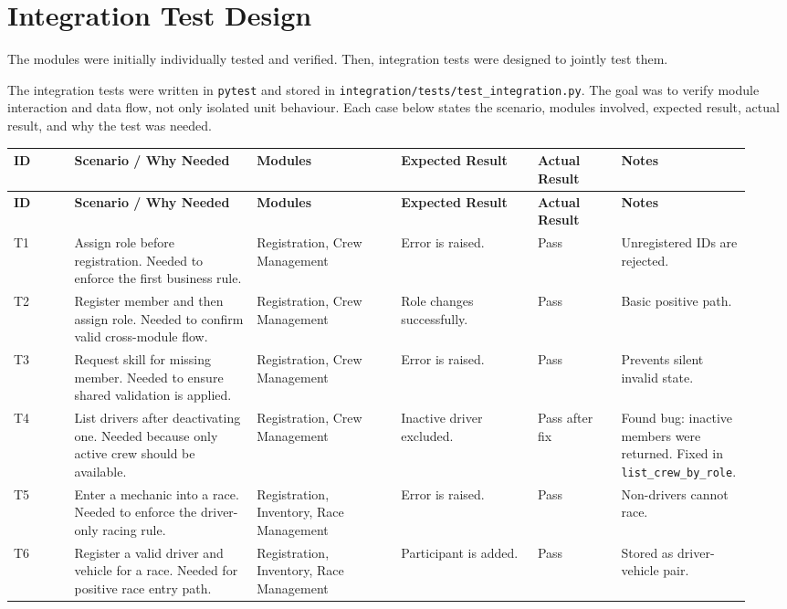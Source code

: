 \documentclass[12pt]{article}
\begin{document}
\section{Integration Test Design}
The modules were initially individually tested and verified. Then, integration tests were designed to jointly test them.

The integration tests were written in \texttt{pytest} and stored in \texttt{integration/tests/test\_integration.py}. The goal was to verify module interaction and data flow, not only isolated unit behaviour. Each case below states the scenario, modules involved, expected result, actual result, and why the test was needed.

\renewcommand{\arraystretch}{1.2}
\small
\begin{longtable}{p{0.08\linewidth}p{0.24\linewidth}p{0.19\linewidth}p{0.18\linewidth}p{0.11\linewidth}p{0.14\linewidth}}
\toprule
\textbf{ID} & \textbf{Scenario / Why Needed} & \textbf{Modules} & \textbf{Expected Result} & \textbf{Actual Result} & \textbf{Notes} \\
\midrule
\endfirsthead
\toprule
\textbf{ID} & \textbf{Scenario / Why Needed} & \textbf{Modules} & \textbf{Expected Result} & \textbf{Actual Result} & \textbf{Notes} \\
\midrule
\endhead
T1 & Assign role before registration. Needed to enforce the first business rule. & Registration, Crew Management & Error is raised. & Pass & Unregistered IDs are rejected. \\
T2 & Register member and then assign role. Needed to confirm valid cross-module flow. & Registration, Crew Management & Role changes successfully. & Pass & Basic positive path. \\
T3 & Request skill for missing member. Needed to ensure shared validation is applied. & Registration, Crew Management & Error is raised. & Pass & Prevents silent invalid state. \\
T4 & List drivers after deactivating one. Needed because only active crew should be available. & Registration, Crew Management & Inactive driver excluded. & Pass after fix & Found bug: inactive members were returned. Fixed in \texttt{list\_crew\_by\_role}. \\
T5 & Enter a mechanic into a race. Needed to enforce the driver-only racing rule. & Registration, Inventory, Race Management & Error is raised. & Pass & Non-drivers cannot race. \\
T6 & Register a valid driver and vehicle for a race. Needed for positive race entry path. & Registration, Inventory, Race Management & Participant is added. & Pass & Stored as driver-vehicle pair. \\

\end{longtable}
\end{document}
